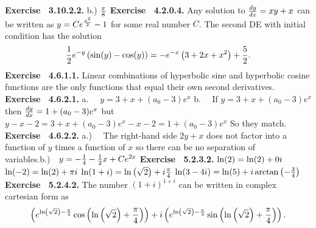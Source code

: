  {\noindent \protect \bf  Exercise ~3.10.2.2.}  b.) $\protect \frac  {\pi }{8}$\protect \newline   \protect \newline  \protect \newline  
 {\noindent \protect \bf  Exercise ~4.2.0.4.} Any solution to $\protect \frac  {dy}{dx}=xy+x$ can be written as $y=Ce^{\protect \frac  {x^2}{2}}-1$ for some real number $C$. The second DE with initial condition has the solution $$\protect \frac  {1}{2}e^{-y}\left (\protect \qopname  \relax o{sin}(y)-\protect \qopname  \relax o{cos}(y)\right )=-e^{-x}\left (3+2x+x^2\right )+\protect \frac  {5}{2}. $$ \protect \newline  \protect \newline  
 {\noindent \protect \bf  Exercise ~4.6.1.1.} Linear combinations of hyperbolic sine and hyperbolic cosine functions are the only functions that equal their own second derivatives.  \protect \newline  \protect \newline  
 {\noindent \protect \bf  Exercise ~4.6.2.1.} a.~~ $y=3 +x + (a_0-3)e^x$ b.~~ If $y =3 +x + (a_0-3)e^x$ then $\protect \frac  {dy}{dx} = 1 +(a_0-3)e^x$ but $y-x-2 = 3+x+(a_0-3)e^x -x-2 = 1 + (a_0-3)e^x$ So they match.  \protect \newline  \protect \newline  
 {\noindent \protect \bf  Exercise ~4.6.2.2.} a.)~~ The right-hand side $2y+x$ does not factor into a function of $y$ times a function of $x$ so there can be no separation of variables.\protect \newline  b.)~~$y = -\protect \frac  {1}{4} -\protect \frac  {1}{2}x +Ce^{2x}$ \protect \newline   \protect \newline  \protect \newline  
 {\noindent \protect \bf  Exercise ~5.2.3.2.} \textbullet $\protect \qopname  \relax o{ln}(2)=\protect \qopname  \relax o{ln}(2)+0i$ \textbullet $\protect \qopname  \relax o{ln}(-2)=\protect \qopname  \relax o{ln}(2)+\pi i$ \textbullet $\protect \qopname  \relax o{ln}(1+i)=\protect \qopname  \relax o{ln}\left (\protect \sqrt  {2}\right )+i\protect \frac  {\pi }{4}$ \textbullet $\protect \qopname  \relax o{ln}(3-4i)=\protect \qopname  \relax o{ln}(5)+i\protect \qopname  \relax o{arctan}\left (-\protect \frac  {3}{4}\right )$ \protect \newline  \protect \newline  
 {\noindent \protect \bf  Exercise ~5.2.4.2.} The number $(1+i)^{1+i}$ can be written in complex cartesian form as $$\left (e^{\protect \qopname  \relax o{ln}\left (\protect \sqrt  {2}\right )-\protect \frac  {\pi }{4}}\protect \qopname  \relax o{cos}\left (\protect \qopname  \relax o{ln}\left (\protect \sqrt  {2}\right )+\protect \frac  {\pi }{4} \right )\right )+i\left (e^{\protect \qopname  \relax o{ln}\left (\protect \sqrt  {2}\right )-\protect \frac  {\pi }{4}}\protect \qopname  \relax o{sin}\left (\protect \qopname  \relax o{ln}\left (\protect \sqrt  {2}\right )+\protect \frac  {\pi }{4} \right )\right ). $$ \protect \newline  \protect \newline  

